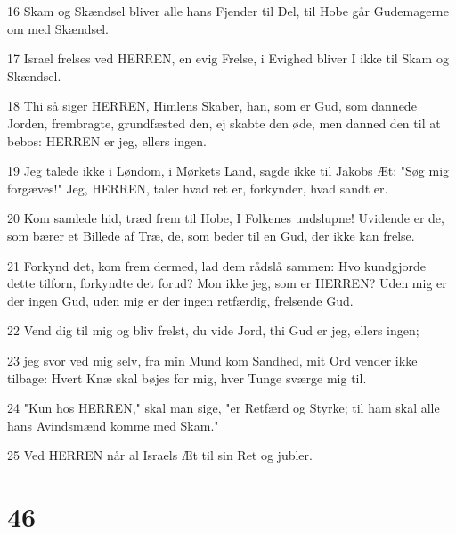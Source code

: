 \par 16 Skam og Skændsel bliver alle hans Fjender til Del, til Hobe går Gudemagerne om med Skændsel.
\par 17 Israel frelses ved HERREN, en evig Frelse, i Evighed bliver I ikke til Skam og Skændsel.
\par 18 Thi så siger HERREN, Himlens Skaber, han, som er Gud, som dannede Jorden, frembragte, grundfæsted den, ej skabte den øde, men danned den til at bebos: HERREN er jeg, ellers ingen.
\par 19 Jeg talede ikke i Løndom, i Mørkets Land, sagde ikke til Jakobs Æt: "Søg mig forgæves!" Jeg, HERREN, taler hvad ret er, forkynder, hvad sandt er.
\par 20 Kom samlede hid, træd frem til Hobe, I Folkenes undslupne! Uvidende er de, som bærer et Billede af Træ, de, som beder til en Gud, der ikke kan frelse.
\par 21 Forkynd det, kom frem dermed, lad dem rådslå sammen: Hvo kundgjorde dette tilforn, forkyndte det forud? Mon ikke jeg, som er HERREN? Uden mig er der ingen Gud, uden mig er der ingen retfærdig, frelsende Gud.
\par 22 Vend dig til mig og bliv frelst, du vide Jord, thi Gud er jeg, ellers ingen;
\par 23 jeg svor ved mig selv, fra min Mund kom Sandhed, mit Ord vender ikke tilbage: Hvert Knæ skal bøjes for mig, hver Tunge sværge mig til.
\par 24 "Kun hos HERREN," skal man sige, "er Retfærd og Styrke; til ham skal alle hans Avindsmænd komme med Skam."
\par 25 Ved HERREN når al Israels Æt til sin Ret og jubler.

\chapter{46}

